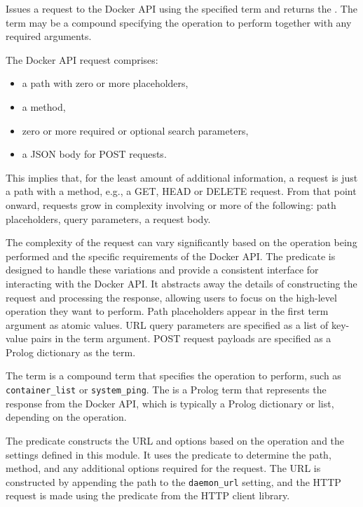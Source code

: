 \begin{description}
Issues a request to the Docker API using the specified  term and
returns the . The  term may be a compound specifying the
operation to perform together with any required arguments.

The Docker API request comprises:

\begin{itemize}
    \item a path with zero or more placeholders,
    \item a method,
    \item zero or more required or optional search parameters,
    \item a JSON body for POST requests.
\end{itemize}

This implies that, for the least amount of additional information, a
request is just a path with a method, e.g., a GET, HEAD or DELETE
request. From that point onward, requests grow in complexity
involving or more of the following: path placeholders, query
parameters, a request body.

The complexity of the request can vary significantly based on the
operation being performed and the specific requirements of the
Docker API. The  predicate is designed to handle these
variations and provide a consistent interface for interacting with
the Docker API. It abstracts away the details of constructing the
request and processing the response, allowing users to focus on
the high-level operation they want to perform. Path placeholders
appear in the first  term argument as atomic values. URL query parameters
are specified as a list of key-value pairs in the  term argument.
POST request payloads are specified as a Prolog dictionary as the  term.

The  term is a compound term that specifies the operation to
perform, such as \verb$container_list$ or \verb$system_ping$. The  is a
Prolog term that represents the response from the Docker API, which
is typically a Prolog dictionary or list, depending on the operation.

The predicate constructs the URL and options based on the operation
and the settings defined in this module. It uses the  predicate
to determine the path, method, and any additional options required for
the request. The URL is constructed by appending the path to the
\verb$daemon_url$ setting, and the HTTP request is made using the
 predicate from the HTTP client library.


\end{description}
